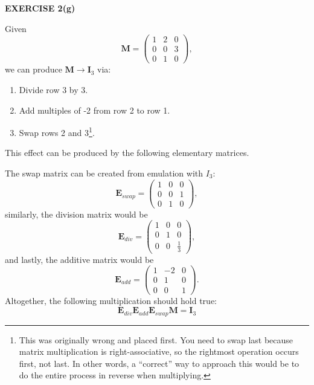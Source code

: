 \documentclass[12pt]{article}
\newcommand{\mat}[1]{\mathbf{#1}}
\newcommand{\exercise}[1]{\textbf{EXERCISE #1}\label{#1}}
\begin{document}
\exercise{2(g)}

Given
\begin{equation*}
  \mat{M} = \begin{pmatrix}
    1 & 2 & 0 \\
    0 & 0 & 3 \\
    0 & 1 & 0
  \end{pmatrix},
\end{equation*}
we can produce $\mat{M} \to \mat{I}_3$ via:
\begin{enumerate}
\item Divide row $3$ by 3.
\item Add multiples of -2 from row 2 to row 1.
\item Swap rows 2 and 3\footnote{This was originally wrong and placed first. You need to swap last because matrix multiplication is right-associative, so the rightmost operation occurs first, not last. In other words, a ``correct'' way to approach this would be to do the entire process in reverse when multiplying.}.
\end{enumerate}
This effect can be produced by the following elementary matrices. 

The swap matrix can be created from emulation with $I_3$:
\begin{equation*}
\mat{E}_{swap} = 
\begin{pmatrix}
 1 & 0 & 0 \\
 0 & 0 & 1 \\
 0 & 1 & 0
\end{pmatrix},
\end{equation*}
similarly, the division matrix would be
\begin{equation*}
\mat{E}_{div} =
\begin{pmatrix}
 1 & 0 & 0 \\
 0 & 1 & 0 \\
 0 & 0 & \frac{1}{3}
\end{pmatrix},
\end{equation*}
and lastly, the additive matrix would be
\begin{equation*}
\mat{E}_{add} =
\begin{pmatrix}
1 & -2 & 0 \\
0 & 1  & 0 \\
0 & 0  & 1
\end{pmatrix}.
\end{equation*}
Altogether, the following multiplication should hold true:
\begin{equation*}
\mat{E}_{div} \mat{E}_{add} \mat{E}_{swap} \mat{M} = \mat{I}_{3}
\end{equation*}
\newpage
\end{document}
